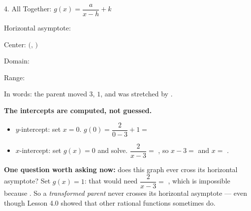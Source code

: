 \documentclass[10pt]{article}
\begin{document}
\begin{notesbox}{4. All Together: $g(x)=\dfrac{a}{x-h}+k$}
\begin{center}
\begin{minipage}{0.48\linewidth}
Horizontal asymptote: 

Center: $($$,\,$$)$

\vspace{3pt}
Domain: 

Range: 

\vspace{3pt}
In words: the parent moved  $3$,  $1$, and was stretched by
.
\end{minipage}
\end{center}

\vspace{2pt}
\textbf{The intercepts are computed, not guessed.}
\begin{itemize}[leftmargin=1.5em, itemsep=3pt]
  \item $y$-intercept: set $x=0$. \; $g(0)=\dfrac{2}{0-3}+1=$ 
  \item $x$-intercept: set $g(x)=0$ and solve. \; $\dfrac{2}{x-3}=$ , \; so
        $x-3=$  and $x=$ .
\end{itemize}

\vspace{3pt}
\textbf{One question worth asking now:} does this graph ever cross its horizontal asymptote? Set
$g(x)=1$: that would need $\dfrac{2}{x-3}=$ , which is impossible because
. So a \emph{transformed parent} never crosses its horizontal asymptote --- even though
Lesson 4.0 showed that other rational functions sometimes do.
\end{notesbox}
\end{document}
